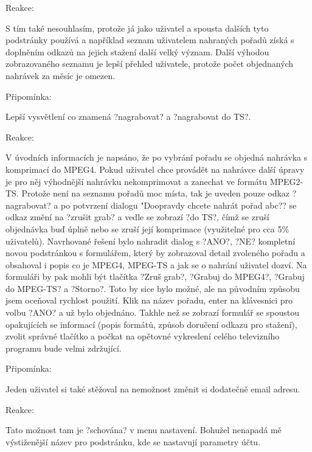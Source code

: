 \begin{bf}Reakce:\end{bf} S tím také nesouhlasím, protože já jako uživatel a spousta dalších tyto podstránky používá a například seznam uživatelem nahraných pořadů získá s doplněním odkazů na jejich stažení další velký význam. Další výhodou zobrazovaného seznamu je lepší přehled uživatele, protože počet objednaných nahrávek za měsíc je omezen.

\vspace{10pt}

\begin{bf}Připomínka:\end{bf} Lepší vysvětlení co znamená ?nagrabovat? a ?nagrabovat do TS?. 

\begin{bf}Reakce:\end{bf} V úvodních informacích je napsáno, že po vybrání pořadu se objedná nahrávka s komprimací do MPEG4. Pokud uživatel chce provádět na nahrávce další úpravy je pro něj výhodnější nahrávku nekomprimovat a zanechat ve formátu MPEG2-TS. Protože není na seznamu pořadů moc místa, tak je uveden pouze odkaz ?nagrabovat? a po potvrzení dialogu "Doopravdy chcete nahrát pořad abc?? se odkaz změní na ?zrušit grab? a vedle se zobrazí ?do TS?, čímž se zruší objednávka buď úplně nebo se zruší její komprimace (využitelné pro cca 5\% uživatelů). Navrhované řešení bylo nahradit dialog s ?ANO?, ?NE? kompletní novou podstránkou s formulářem, který by zobrazoval detail zvoleného pořadu a obsahoval i popis co je MPEG4, MPEG-TS a jak se o nahrání uživatel dozví. Na formuláři by pak mohli být tlačítka ?Zruš grab?, ?Grabuj do MPEG4?, ?Grabuj do MPEG-TS? a ?Storno?. Toto by sice bylo možné, ale na původním způsobu jsem oceňoval rychlost použití. Klik na název pořadu, enter na klávesnici pro volbu ?ANO? a už bylo objednáno. Takhle než se zobrazí formulář se spoustou opakujících se informací (popis formátů, způsob doručení odkazu pro stažení), zvolit správné tlačítko a počkat na opětovné vykreslení celého televizního programu bude velmi zdržující.

\vspace{10pt}

\begin{bf}Připomínka:\end{bf} Jeden uživatel si také stěžoval na nemožnost změnit si dodatečně email adresu. 

\begin{bf}Reakce:\end{bf} Tato možnost tam je ?schována? v menu nastavení. Bohužel nenapadá mě výstiženější název pro podstránku, kde se nastavují parametry účtu.

